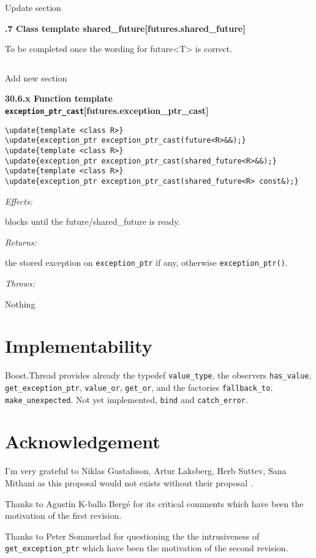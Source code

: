 \documentclass[a4paper,10pt]{article}
\newcommand{\wordingUpdateSubSubSec}[2]{\vspace{15pt}
\noindent
{\textbf{\quad #1\hfill\textbf{[#2]}}}
\label{#2}
\vspace{7pt}
}
\newcommand{\wordingNewSubSubSec}[2]{\vspace{15pt}
\noindent
{\textbf{\quad #1\hfill\textbf{[#2]}}}
\label{#2}
\vspace{7pt}
}
\newcommand{\cpp}[1]{\lstinline{#1}}
\newcommand{\wordingItem}[1]{\noindent\textit{#1:}}
\newenvironment{wordingPara}{\begin{adjustwidth}{12pt}{}}{\end{adjustwidth}}
\newenvironment{Effects}{\wordingItem{Effects}\vspace{7pt}\noindent\begin{adjustwidth}{12pt}{}}{\vspace{7pt}\end{adjustwidth}}
\newenvironment{Throws}{\wordingItem{Throws}\vspace{7pt}\noindent\begin{adjustwidth}{12pt}{}}{\vspace{7pt}\end{adjustwidth}}
\newenvironment{Returns}{\wordingItem{Returns}\vspace{7pt}\noindent\begin{adjustwidth}{12pt}{}}{\vspace{7pt}\end{adjustwidth}}
\newcommand{\update}[1]{\colorbox{update_color}{#1}}
\begin{document}
\noindent
Update section

\wordingUpdateSubSubSec{30.6.7 Class template shared_future}{futures.shared_future}

\noindent
To be completed once the wording for future<T> is correct.

\begin{lstlisting}[xleftmargin=0pt]
\end{lstlisting}


\noindent
Add new section

\wordingNewSubSubSec{\update{30.6.x Function template \cpp{exception_ptr_cast}}}{futures.exception_ptr_cast}

\begin{lstlisting}[xleftmargin=0pt]
\update{template <class R>}
\update{exception_ptr exception_ptr_cast(future<R>&&);}
\update{template <class R>}
\update{exception_ptr exception_ptr_cast(shared_future<R>&&);}
\update{template <class R>}
\update{exception_ptr exception_ptr_cast(shared_future<R> const&);}
\end{lstlisting}
\begin{wordingPara}

\begin{Effects}
blocks until the future/shared_future is ready.
\end{Effects}

\begin{Returns}
the stored exception on  \cpp{exception_ptr} if any, otherwise \cpp{exception_ptr()}.
\end{Returns}

\begin{Throws}
Nothing 
\end{Throws}

\end{wordingPara}

\noindent
\section{Implementability}

Boost.Thread \cite{BOOST_THREAD} provides already the typedef \cpp{value_type}, the observers \cpp{has_value},  \cpp{get_exception_ptr}, \cpp{value_or}, \cpp{get_or}, and the factories \cpp{fallback_to}, \cpp{make_unexpected}. Not yet implemented, \cpp{bind} and \cpp{catch_error}.

\section{Acknowledgement}

I'm very grateful to Niklas Gustafsson, Artur Laksberg, Herb Suttev, Sana Mithani as this proposal would not exists without their proposal  \cite{N3784}.

Thanks to Agust\'{i}n K-ballo Berg\'{e} for its critical comments which have been the motivation of the first revision.

Thanks to Peter Sommerlad for questioning the the intrusiveness of \cpp{get_exception_ptr} which have been the motivation of the second revision.

\newpage


\end{document}
